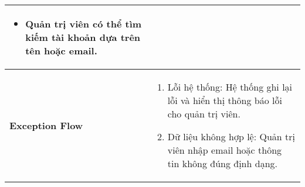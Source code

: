 \begin{longtable}[H]{|l|p{}|}
\begin{itemize}[leftmargin=4mm]
        \item Quản trị viên có thể tìm kiếm tài khoản dựa trên tên hoặc email.
    \end{itemize} \\
    \hline
    \textbf{Exception Flow} & \vspace{-0.75cm}  
    \begin{enumerate}[leftmargin=5.5mm]
        \item Lỗi hệ thống: Hệ thống ghi lại lỗi và hiển thị thông báo lỗi cho quản trị viên.
        \item Dữ liệu không hợp lệ: Quản trị viên nhập email hoặc thông tin không đúng định dạng.
    \end{enumerate} \\
    \hline
\end{longtable}

